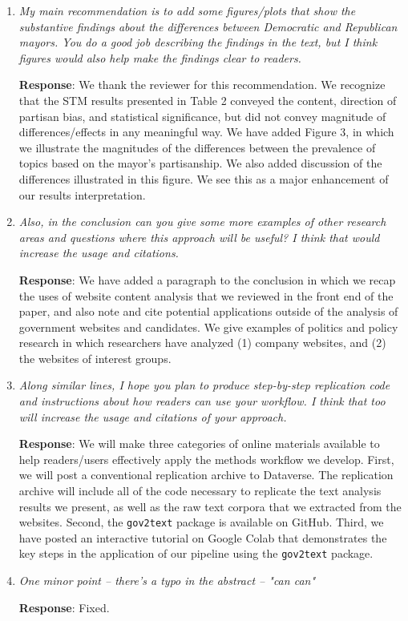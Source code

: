 \documentclass[12pt,titlepage]{article}
\begin{document}
\begin{enumerate}


\item \emph{My main recommendation is to add some figures/plots that show the substantive findings about the differences between Democratic and Republican mayors.  You do a good job describing the findings in the text, but I think figures would also help make the findings clear to readers.  } 

	\textbf{Response}: We thank the reviewer for this recommendation. We recognize that the STM results presented in Table 2 conveyed the content, direction of partisan bias, and statistical significance, but did not convey magnitude of differences/effects in any meaningful way. We have added Figure 3, in which we illustrate the magnitudes of the differences between the prevalence of topics based on the mayor's partisanship. We also added discussion of the differences illustrated in this figure. We see this as a major enhancement of our results interpretation.
	
	\item \emph{ Also, in the conclusion can you give some more examples of other research areas and questions where this approach will be useful? I think that would increase the usage and citations.  } 

	\textbf{Response}: We have added a paragraph to the conclusion in which we recap the uses of website content analysis that we reviewed in the front end of the paper, and also note and cite potential applications outside of the analysis of government websites and candidates. We give examples of politics and policy research in which researchers have analyzed (1) company websites, and (2) the websites of interest groups.
	
	\item \emph{ Along similar lines, I hope you plan to produce step-by-step replication code and instructions about how readers can use your workflow.  I think that too will increase the usage and citations of your approach.  } 

	\textbf{Response}: We will make three categories of online materials available to help readers/users effectively apply the methods workflow we develop. First, we will post a conventional replication archive to Dataverse. The replication archive will include all of the code necessary to replicate the text analysis results we present, as well as the raw text corpora that we extracted from the websites. Second, the \texttt{gov2text} package is available on GitHub. Third, we have posted an interactive tutorial on Google Colab that demonstrates the key steps in the application of our pipeline using the \texttt{gov2text} package.

\item \emph{ One minor point -- there's a typo in the abstract -- "can can" } 


\textbf{Response}: Fixed. 


\end{enumerate}
\end{document}

